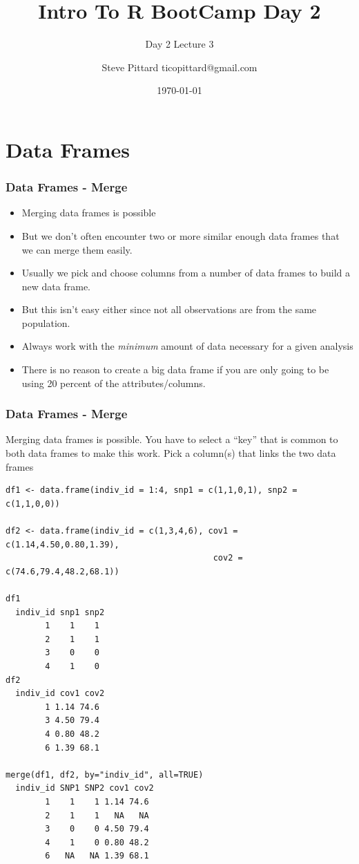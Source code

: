 \documentclass{beamer}
\begin{document}


\title{Intro To R BootCamp Day 2}
\author{Steve Pittard ticopittard@gmail.com}
\subtitle{Day 2 Lecture 3}
\date{\today}

\maketitle


\section{Data Frames}


\begin{frame}[fragile]
\frametitle{Data Frames - Merge}
\begin{itemize}

\item Merging data frames is possible  

\item But we don't often encounter two or more similar
enough data frames that we can merge them easily. 

\item Usually we pick and choose columns from a number of data frames to build a new data frame. 

\item But this isn't easy either since not all observations are from the same population.

\item Always work with the \emph{minimum} amount of data necessary for a given analysis 

\item There is no reason to create a big data frame if you are only going to be using 20 percent of 
the attributes/columns.
\end{itemize}
\end{frame}



\begin{frame}[fragile]
\frametitle{Data Frames - Merge}
Merging data frames is possible. You have to select a ``key'' that is common to both data frames to make this work. Pick a column(s) that links the two data frames
\footnotesize
\begin{verbatim}
df1 <- data.frame(indiv_id = 1:4, snp1 = c(1,1,0,1), snp2 = c(1,1,0,0)) 

df2 <- data.frame(indiv_id = c(1,3,4,6), cov1 = c(1.14,4.50,0.80,1.39), 
                                          cov2 = c(74.6,79.4,48.2,68.1))

df1
  indiv_id snp1 snp2
        1    1    1
        2    1    1
        3    0    0
        4    1    0
df2
  indiv_id cov1 cov2
        1 1.14 74.6
        3 4.50 79.4
        4 0.80 48.2
        6 1.39 68.1

merge(df1, df2, by="indiv_id", all=TRUE)
  indiv_id SNP1 SNP2 cov1 cov2
        1    1    1 1.14 74.6
        2    1    1   NA   NA
        3    0    0 4.50 79.4
        4    1    0 0.80 48.2
        6   NA   NA 1.39 68.1
\end{verbatim}
\end{frame}
\end{document}
